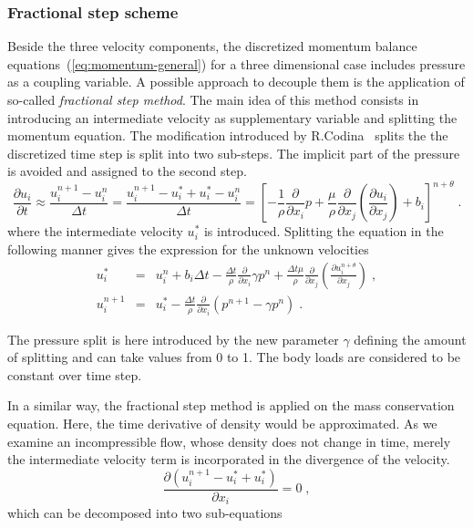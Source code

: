 \documentclass[a4paper]{report}
\newcommand{\pard}[2]{\frac{\partial{#1}}{\partial{#2}}}
\begin{document}
\subsubsection{Fractional step scheme}
Beside the three velocity components, the discretized momentum balance equations~(\ref{eq:momentum-general}) for a three dimensional case includes pressure as a coupling variable. A possible approach to decouple them is the application of so-called \emph{fractional step method}. The main idea of this method consists in introducing an intermediate velocity as supplementary variable and splitting the momentum equation. The modification introduced by R.Codina~\cite{Codina01} splits the the discretized time step is split into two sub-steps. The implicit part of the pressure is avoided and assigned to the second step.
\begin{equation}
  \pard{u_i}{t} \approx \frac{u^{n+1}_i-u^n_i}{\Delta t}=\frac{u^{n+1}_i-u^*_i+u^*_i-u^n_i}{\Delta t}= \left[ - \frac{1}{\rho}\frac{\partial}{\partial x_i}p+\frac{\mu}{\rho}\frac{\partial}{\partial x_j}\left(\frac{\partial u_i}{\partial x_j}\right)+b_i\right]^{n+\theta}\;.
\end{equation}
where the intermediate velocity $u^*_i$ is introduced. Splitting the equation in the following manner gives the expression for the unknown velocities
\begin{eqnarray}\label{rce:uistar}
    u^*_i &=& u^n_i+b_i\Delta t - \frac{\Delta t}{\rho}\pard{}{x_i}\gamma p^n+\frac{\Delta t\mu}{\rho}\pard{}{x_j}\left(\pard{u^{n+\theta}_i}{x_j}\right)\;,\\
    u^{n+1}_i &=& u^*_i- \frac{\Delta t}{\rho}\pard{}{x_i}(p^{n+1}-\gamma p^n)\;. \label{eq:uin1}
\end{eqnarray}

The pressure split is here introduced by the new parameter $\gamma$ defining the amount of splitting and can take values from 0 to 1. The body loads are considered to be constant over time step.
\par
In a similar way, the fractional step method is applied on the mass conservation equation. Here, the time derivative of density would be approximated. As we examine an incompressible flow, whose density does not change in time, merely the intermediate velocity term is incorporated in the divergence of the velocity.
\begin{equation}
  \pard{(u^{n+1}_i-u^*_i+u^*_i)}{x_i} = 0 \;,
\end{equation}
which can be decomposed into two sub-equations
\end{document}
